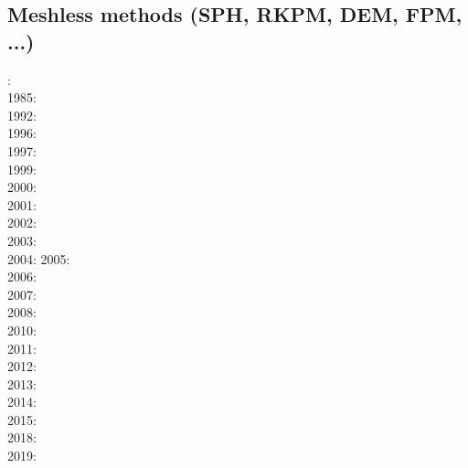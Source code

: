 {\scriptsize
\noindent
\cite{trry95}
\cite{evan03}
\cite{zhzl07}\cite{copb07}\cite{phbu07}
\cite{zhzm09}\cite{onlj09}
\cite{lemj11}\cite{burk11}
\cite{buto14}\cite{helo14}\cite{roct14}
\cite{woda17}
\cite{begb19}\cite{wihb19}\cite{huzl19}
}

\subsection{Meshless methods (SPH, RKPM, DEM, FPM, ...)}

{\scriptsize
{}: \cite{lucy77}\\
1985: \cite{mona85}\\
1992: \cite{mona92}\\
1996: \cite{beko96}\\
1997: \cite{mofz97}\\
1999: \cite{zhfm99}\\
2000: \cite{begl00}\cite{lihl00}\\
2001: \cite{idso01}\\
2002: \cite{lilr02}\cite{lill02}\cite{lili02}\\
2003: \cite{lill03}\cite{mamo03}\\
2004: \cite{wali04}\cite{hufl04}
2005: \cite{febh05}\cite{lixl05}\cite{thes05}\cite{thje05a}\cite{thje05b}\\
2006: \cite{lili06}\cite{yabm06}\\
2007: \cite{busf07}\\
2008: \cite{bufs08}\cite{lemx08}\\
2010: \cite{dacl10}\\
2011: \cite{prcl11}\cite{kukg11}\cite{kadm11}\cite{szpt11}\cite{howt11}\\
2012: \cite{szpm12}\\
2013: \cite{koau13}\cite{viau13}\\
2014: \cite{dazs14}\cite{lekb14}\\
2015: \cite{nifs15}\\
2018: \cite{krrk18}\cite{goej18}\\
2019: \cite{meho19}\cite{meho19b}
}

